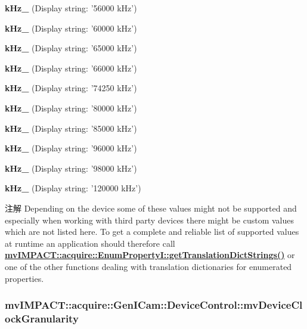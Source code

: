 \begin{DoxyItemize}
\item {\bfseries k\+Hz\+\_} (Display string\+: '56000 k\+Hz')
\item {\bfseries k\+Hz\+\_} (Display string\+: '60000 k\+Hz')
\item {\bfseries k\+Hz\+\_} (Display string\+: '65000 k\+Hz')
\item {\bfseries k\+Hz\+\_} (Display string\+: '66000 k\+Hz')
\item {\bfseries k\+Hz\+\_} (Display string\+: '74250 k\+Hz')
\item {\bfseries k\+Hz\+\_} (Display string\+: '80000 k\+Hz')
\item {\bfseries k\+Hz\+\_} (Display string\+: '85000 k\+Hz')
\item {\bfseries k\+Hz\+\_} (Display string\+: '96000 k\+Hz')
\item {\bfseries k\+Hz\+\_} (Display string\+: '98000 k\+Hz')
\item {\bfseries k\+Hz\+\_} (Display string\+: '120000 k\+Hz')
\end{DoxyItemize}

\begin{DoxyNote}{注解}
Depending on the device some of these values might not be supported and especially when working with third party devices there might be custom values which are not listed here. To get a complete and reliable list of supported values at runtime an application should therefore call {\bfseries \hyperlink{classmv_i_m_p_a_c_t_1_1acquire_1_1_enum_property_i_a0ba6ccbf5ee69784d5d0b537924d26b6}{mv\+I\+M\+P\+A\+C\+T\+::acquire\+::\+Enum\+Property\+I\+::get\+Translation\+Dict\+Strings()}} or one of the other functions dealing with translation dictionaries for enumerated properties. 
\end{DoxyNote}
\hypertarget{classmv_i_m_p_a_c_t_1_1acquire_1_1_gen_i_cam_1_1_device_control_ab22c5302456ba77dc4ca840edd714703}{
\subsubsection[{mv\+Device\+Clock\+Granularity}]{ mv\+I\+M\+P\+A\+C\+T\+::acquire\+::\+Gen\+I\+Cam\+::\+Device\+Control\+::mv\+Device\+Clock\+Granularity}}\label{classmv_i_m_p_a_c_t_1_1acquire_1_1_gen_i_cam_1_1_device_control_ab22c5302456ba77dc4ca840edd714703}


